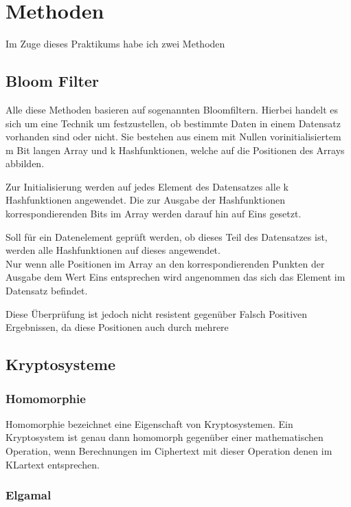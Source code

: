 \chapter{Methoden}
\label{sec:Chapter2}
Im Zuge dieses Praktikums habe ich zwei Methoden 

\section{Bloom Filter}
\label{sec:Sec1.2}

Alle diese Methoden basieren auf sogenannten Bloomfiltern.
Hierbei handelt es sich um eine  Technik um festzustellen, ob bestimmte Daten in einem Datensatz vorhanden sind oder nicht.
Sie bestehen aus einem mit Nullen vorinitialisiertem m Bit langen Array und k Hashfunktionen, welche auf die Positionen des Arrays abbilden.

Zur Initialisierung werden auf jedes Element des Datensatzes alle k Hashfunktionen angewendet.
Die zur Ausgabe der Hashfunktionen korrespondierenden Bits im Array werden darauf hin auf Eins gesetzt.

Soll für ein Datenelement geprüft werden, ob dieses Teil des Datensatzes ist, werden  alle Hashfunktionen auf dieses angewendet.\\
Nur wenn alle Positionen im Array an den korrespondierenden Punkten der Ausgabe dem Wert Eins entsprechen wird angenommen das sich das Element im Datensatz befindet.

Diese Überprüfung ist jedoch nicht resistent gegenüber Falsch Positiven Ergebnissen, da diese Positionen auch durch mehrere 

\section{Kryptosysteme}
\label{sec:Sec1.3}

\subsection{Homomorphie}
Homomorphie bezeichnet eine Eigenschaft von Kryptosystemen. 
Ein Kryptosystem ist genau dann homomorph gegenüber einer mathematischen Operation, wenn Berechnungen im Ciphertext mit dieser Operation denen im KLartext entsprechen.

\subsection{Elgamal}
\label{sec:Sec1.3.1}

